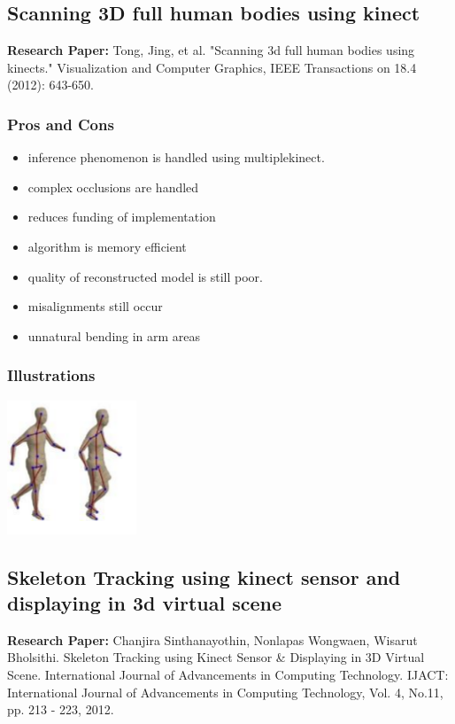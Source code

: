 \documentclass[a4paper,10pt]{report}
\begin{document}
\subsection{Scanning 3D full human bodies using kinect}
\textbf{Research Paper:} Tong, Jing, et al. "Scanning 3d full human bodies using kinects." Visualization and Computer Graphics, IEEE Transactions on 18.4 (2012): 643-650.
\subsubsection{Pros and Cons}
\begin{itemize}
 \item inference phenomenon is handled using multiplekinect.
 \item complex occlusions are handled
 \item reduces funding of implementation
 \item algorithm is memory efficient
 \item quality of reconstructed model is still poor.
 \item misalignments still occur
 \item unnatural bending in arm areas
\end{itemize}
\subsubsection{Illustrations}\newline\newline
\includegraphics{./tech7.png}
\newline\newline


\subsection{Skeleton Tracking using kinect sensor and displaying in 3d virtual scene}
\textbf{Research Paper:} Chanjira Sinthanayothin, Nonlapas Wongwaen, Wisarut Bholsithi. Skeleton Tracking using Kinect Sensor & Displaying in 3D Virtual Scene. International Journal of Advancements in Computing Technology. IJACT: International Journal of Advancements in Computing Technology, Vol. 4, No.11, pp. 213 - 223, 2012.
\end{document}
